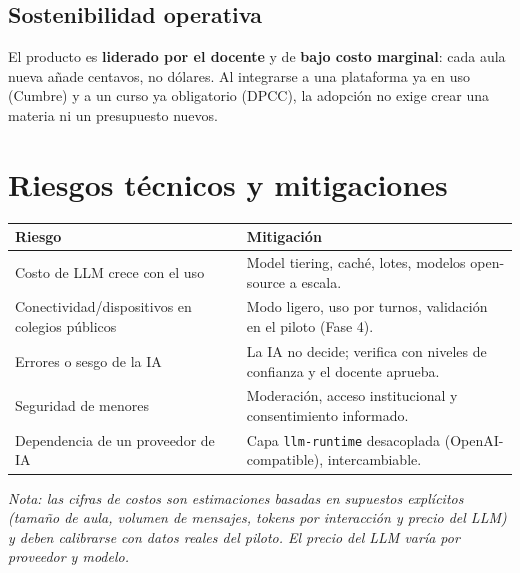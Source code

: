 \documentclass[11pt,a4paper]{article}
\begin{document}
\subsection{Sostenibilidad operativa}
El producto es \textbf{liderado por el docente} y de \textbf{bajo costo marginal}: cada aula nueva a\~nade centavos, no d\'olares. Al integrarse a una plataforma ya en uso (Cumbre) y a un curso ya obligatorio (DPCC), la adopci\'on no exige crear una materia ni un presupuesto nuevos.

\section{Riesgos t\'ecnicos y mitigaciones}
\begin{tabularx}{\textwidth}{@{}X X@{}}
\toprule
\textbf{Riesgo} & \textbf{Mitigaci\'on} \\
\midrule
Costo de LLM crece con el uso & Model tiering, cach\'e, lotes, modelos open-source a escala. \\
Conectividad/dispositivos en colegios p\'ublicos & Modo ligero, uso por turnos, validaci\'on en el piloto (Fase 4). \\
Errores o sesgo de la IA & La IA no decide; verifica con niveles de confianza y el docente aprueba. \\
Seguridad de menores & Moderaci\'on, acceso institucional y consentimiento informado. \\
Dependencia de un proveedor de IA & Capa \texttt{llm-runtime} desacoplada (OpenAI-compatible), intercambiable. \\
\bottomrule
\end{tabularx}

\vfill
\noindent\footnotesize\textit{Nota: las cifras de costos son estimaciones basadas en supuestos expl\'icitos (tama\~no de aula, volumen de mensajes, tokens por interacci\'on y precio del LLM) y deben calibrarse con datos reales del piloto. El precio del LLM var\'ia por proveedor y modelo.}
\end{document}
